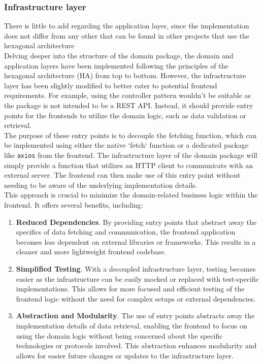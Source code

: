 \documentclass[../design.tex]{subfiles}
\begin{document}
\subsubsection{Infrastructure layer}
There is little to add regarding the application layer, since the implementation
does not differ from any other that can be found in other projects that use the
hexagonal architecture
\\[8pt]
Delving deeper into the structure of the domain package, the domain and
application layers have been implemented following the principles of the
hexagonal architecture (HA) from top to bottom. However, the infrastructure
layer has been slightly modified to better cater to potential frontend
requirements. For example, using the controller pattern wouldn't be suitable as
the package is not intended to be a REST API. Instead, it should provide entry
points for the frontends to utilize the domain logic, such as data validation or
retrieval.
\\
The purpose of these entry points is to decouple the fetching function, which
can be implemented using either the native `fetch` function or a dedicated
package like \texttt{axios} from the frontend. The infrastructure layer of the
domain package will simply provide a function that utilizes an HTTP client to
communicate with an external server. The frontend can then make use of this
entry point without needing to be aware of the underlying implementation
details.
\\
This approach is crucial to minimize the domain-related business logic within
the frontend. It offers several benefits, including:
\begin{enumerate}
	\item\textbf{Reduced Dependencies}. By providing entry points that abstract away the
	specifics of data fetching and communication, the frontend application becomes
	less dependent on external libraries or frameworks. This results in a
	cleaner and more lightweight frontend codebase.
	\item\textbf{Simplified Testing}. With a decoupled infrastructure layer, testing
	becomes easier as the infrastructure can be easily mocked or replaced with
	test-specific implementations. This allows for more focused and efficient
	testing of the frontend logic without the need for complex setups or
	external dependencies.
	\item\textbf{Abstraction and Modularity}. The use of entry points abstracts away the
	implementation details of data retrieval, enabling the frontend to focus
	on using the domain logic without being concerned about the specific
	technologies or protocols involved. This abstraction enhances modularity
	and allows for easier future changes or updates to the infrastructure
	layer.
\end{enumerate}
\end{document}
